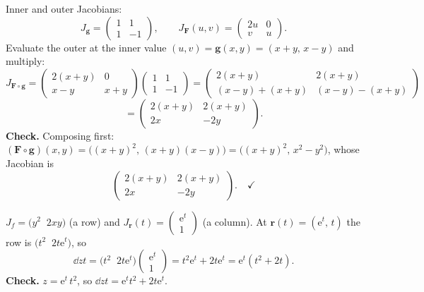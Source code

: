 \begin{solutions}
  \item Inner and outer Jacobians:
        \[
          J_{\mathbf{g}}=\begin{pmatrix}1&1\\1&-1\end{pmatrix},\qquad
          J_{\mathbf{F}}(u,v)=\begin{pmatrix}2u&0\\v&u\end{pmatrix} .
        \]
        Evaluate the outer at the inner value
        $(u,v)=\mathbf{g}(x,y)=(x+y,\,x-y)$ and multiply:
        \[
          J_{\mathbf{F}\circ\mathbf{g}}
            =\begin{pmatrix}2(x+y)&0\\x-y&x+y\end{pmatrix}
             \begin{pmatrix}1&1\\1&-1\end{pmatrix}
            =\begin{pmatrix}2(x+y)&2(x+y)\\
              (x-y)+(x+y)&(x-y)-(x+y)\end{pmatrix}
        \]
        \[
          \phantom{J_{\mathbf{F}\circ\mathbf{g}}}
            =\begin{pmatrix}2(x+y)&2(x+y)\\2x&-2y\end{pmatrix} .
        \]
        \textbf{Check.} Composing first:
        $(\mathbf{F}\circ\mathbf{g})(x,y)
        =\bigl((x+y)^{2},\,(x+y)(x-y)\bigr)
        =\bigl((x+y)^{2},\,x^{2}-y^{2}\bigr)$, whose Jacobian is
        \[
          \begin{pmatrix}2(x+y)&2(x+y)\\2x&-2y\end{pmatrix} .
          \quad\checkmark
        \]

  \item $J_{f}=\bigl(y^{2}\;\;2xy\bigr)$ (a row) and
        $J_{\mathbf{r}}(t)=\begin{pmatrix}\mathrm{e}^{t}\\1\end{pmatrix}$
        (a column). At $\mathbf{r}(t)=(\mathrm{e}^{t},\,t)$ the row is
        $\bigl(t^{2}\;\;2t\mathrm{e}^{t}\bigr)$, so
        \[
          \dd{z}{t}
            =\bigl(t^{2}\;\;2t\mathrm{e}^{t}\bigr)
             \begin{pmatrix}\mathrm{e}^{t}\\1\end{pmatrix}
            =t^{2}\mathrm{e}^{t}+2t\mathrm{e}^{t}
            =\mathrm{e}^{t}(t^{2}+2t) .
        \]
        \textbf{Check.} $z=\mathrm{e}^{t}\,t^{2}$, so
        $\dd{z}{t}=\mathrm{e}^{t}t^{2}+2t\mathrm{e}^{t}$. \checkmark


\end{solutions}
